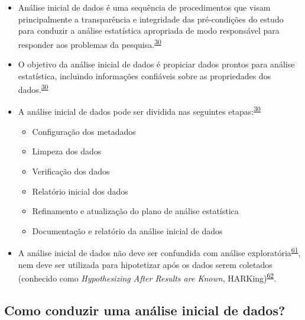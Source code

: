 \documentclass[
]{book}
\begin{document}
\begin{itemize}
\item
  Análise inicial de dados é uma sequência de procedimentos que visam principalmente a transparência e integridade das pré-condições do estudo para conduzir a análise estatística apropriada de modo responsável para responder aos problemas da pesquisa.\textsuperscript{\protect\hyperlink{ref-Baillie2022}{30}}
\item
  O objetivo da análise inicial de dados é propiciar dados prontos para análise estatística, incluindo informações confiáveis sobre as propriedades dos dados.\textsuperscript{\protect\hyperlink{ref-Baillie2022}{30}}
\item
  A análise inicial de dados pode ser dividida nas seguintes etapas:\textsuperscript{\protect\hyperlink{ref-Baillie2022}{30}}

  \begin{itemize}
  \item
    Configuração dos metadados
  \item
    Limpeza dos dados
  \item
    Verificação dos dados
  \item
    Relatório inicial dos dados
  \item
    Refinamento e atualização do plano de análise estatística
  \item
    Documentação e relatório da análise inicial de dados
  \end{itemize}
\item
  A análise inicial de dados não deve ser confundida com análise exploratória\textsuperscript{\protect\hyperlink{ref-Ferketich1986}{61}}, nem deve ser utilizada para hipotetizar após os dados serem coletados (conhecido como \emph{Hypothesizing After Results are Known}, HARKing)\textsuperscript{\protect\hyperlink{ref-Kerr1998}{62}}.
\end{itemize}

\hypertarget{como-conduzir-uma-anuxe1lise-inicial-de-dados}{%
\subsection{Como conduzir uma análise inicial de dados?}\label{como-conduzir-uma-anuxe1lise-inicial-de-dados}}
\end{document}
